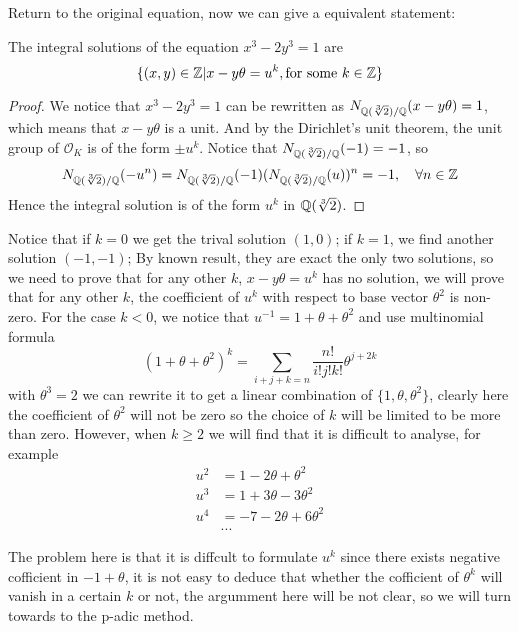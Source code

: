 Return to the original equation, now we can give a equivalent statement:
\begin{proposition} \label{equi}
    The integral solutions of the equation \(x^3-2y^3=1\) are
    \[\{(x,y)\in \mathbb{Z}| x-y\theta = u^k, \text{for some } k \in \mathbb{Z}\}\]

    \begin{proof}
        We notice that \(x^3-2y^3 = 1 \) can be rewritten as \(N_{\mathbb{Q}(\sqrt[3]{2}) / \mathbb{Q}}(x-y\theta) = 1\), which means that \(x-y\theta\) is a unit. And by the Dirichlet's unit theorem, the unit group of \(\mathcal{O}_K\) is of the form \(\pm u^k\). Notice that \(N_{\mathbb{Q}(\sqrt[3]{2}) / \mathbb{Q}}(-1) = -1\), so
        \[N_{\mathbb{Q}(\sqrt[3]{2}) / \mathbb{Q}}(-u^n) = N_{\mathbb{Q}(\sqrt[3]{2}) / \mathbb{Q}}(-1)(N_{\mathbb{Q}(\sqrt[3]{2}) / \mathbb{Q}}(u))^n = -1, \quad \forall n \in \mathbb{Z} \]
        Hence the integral solution is of the form \(u^k\) in \(\mathbb{Q}(\sqrt[3]{2})\).
    \end{proof}
\end{proposition}

Notice that if \(k=0\) we get the trival solution \((1,0)\); if \(k=1\), we find another solution \((-1,-1)\); By known result, they are exact the only two solutions, so we need to prove that for any other \(k\), \(x-y\theta = u^k\) has no solution, we will prove that for any other \(k\), the coefficient of \(u^k\) with respect to base vector \(\theta^2\) is non-zero. For the case \(k<0\), we notice that \(u^{-1} = 1+\theta +\theta^2\) and use multinomial formula
\[(1+\theta+ \theta^2)^k = \sum_{i+j+k=n} \frac{n!}{i!j!k!}\theta ^{j+2k}\]
with \(\theta ^3= 2\) we can rewrite it to get a linear combination of \(\{1,\theta,\theta ^2\}\), clearly here the coefficient of \(\theta ^2\) will not be zero so the choice of \(k\) will be limited to be more than zero. However, when \(k \geq  2\) we will find that it is difficult to analyse, for example
\begin{align*}
    u^2 &= 1- 2\theta +\theta^2 \\
    u^3 &= 1+3\theta-3\theta^2 \\
    u^4 &= -7-2\theta+6\theta^2\\
    &...
\end{align*}
 
The problem here is that it is diffcult to formulate \(u^{k}\) since there exists negative cofficient in \(-1+\theta\), it is not easy to deduce that whether the cofficient of \(\theta^k\) will vanish in a certain \(k\) or not, the argumment here will be not clear, so we will turn towards to the p-adic method.
\newline 

